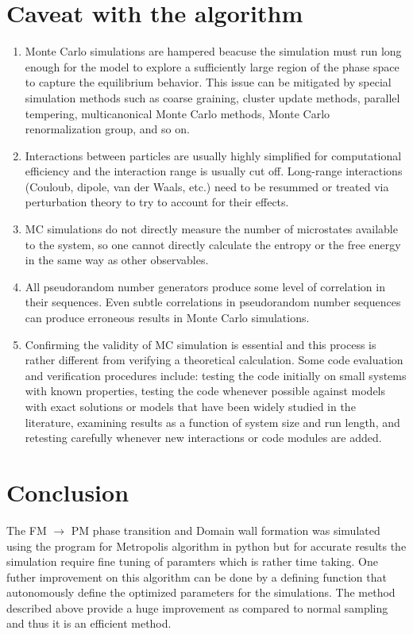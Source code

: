 \documentclass[5p,authoryear]{elsarticle}
\begin{document}
\section{Caveat with the algorithm}
\begin{enumerate}
  \item Monte Carlo simulations are hampered beacuse the simulation must run long enough for the model to explore a sufficiently large region of the phase space to capture the equilibrium behavior. This issue can be mitigated by special simulation methods such as coarse graining, cluster update methods, parallel tempering, multicanonical Monte Carlo methods, Monte Carlo renormalization group, and so on.
  \item Interactions between particles are usually highly simplified for computational efficiency and the interaction range is usually cut off. Long-range interactions (Couloub, dipole, van der Waals, etc.) need to be resummed or treated via perturbation theory to try to account for their effects.
  \item MC simulations do not directly measure the number of microstates available to the system, so one cannot directly calculate the entropy or the free energy in the same way as other observables.
  \item All pseudorandom number generators produce some level of correlation in their sequences. Even subtle correlations in pseudorandom number sequences can produce erroneous results in Monte Carlo simulations.
  \item Confirming the validity of MC simulation is essential and this process is rather different from verifying a theoretical calculation. Some code
evaluation and verification procedures include: testing the code initially on small systems with known properties, testing the code whenever possible against models with exact solutions or models that have been widely studied in the literature, examining results as a function of system size and run length, and retesting carefully whenever new interactions or code modules are added.
\end{enumerate}

\section{Conclusion}
The FM $\rightarrow$ PM phase transition and Domain wall formation was simulated using the program for Metropolis algorithm in python but for accurate results the simulation require fine tuning of paramters which is rather time taking. One futher improvement on this algorithm can be done by a defining function that autonomously define the optimized parameters for the simulations. The method described above provide a huge improvement as compared to normal sampling and thus it is an efficient method.
\end{document}
